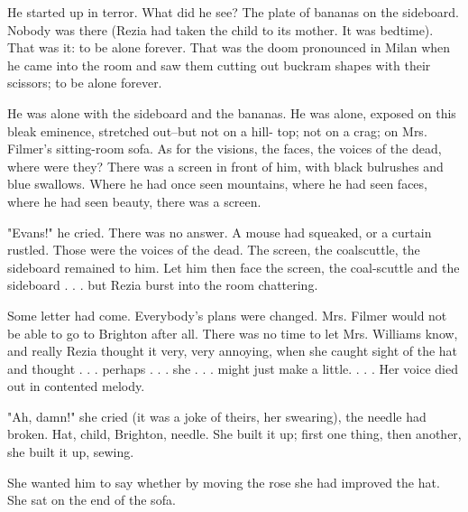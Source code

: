 \documentclass[lang=cn,10pt]{elegantbook}
\begin{document}
He started up in terror.  What did he see?  The plate of bananas on
the sideboard.  Nobody was there (Rezia had taken the child to its
mother.  It was bedtime).  That was it: to be alone forever.  That
was the doom pronounced in Milan when he came into the room and saw
them cutting out buckram shapes with their scissors; to be alone
forever.

He was alone with the sideboard and the bananas.  He was alone,
exposed on this bleak eminence, stretched out--but not on a hill-
top; not on a crag; on Mrs. Filmer's sitting-room sofa.  As for the
visions, the faces, the voices of the dead, where were they?  There
was a screen in front of him, with black bulrushes and blue
swallows.  Where he had once seen mountains, where he had seen
faces, where he had seen beauty, there was a screen.

"Evans!" he cried.  There was no answer.  A mouse had squeaked, or
a curtain rustled.  Those were the voices of the dead.  The screen,
the coalscuttle, the sideboard remained to him.  Let him then face
the screen, the coal-scuttle and the sideboard . . . but Rezia
burst into the room chattering.

Some letter had come.  Everybody's plans were changed.  Mrs. Filmer
would not be able to go to Brighton after all.  There was no time
to let Mrs. Williams know, and really Rezia thought it very, very
annoying, when she caught sight of the hat and thought . . .
perhaps . . . she . . . might just make a little. . . .  Her voice
died out in contented melody.

"Ah, damn!" she cried (it was a joke of theirs, her swearing), the
needle had broken.  Hat, child, Brighton, needle.  She built it up;
first one thing, then another, she built it up, sewing.

She wanted him to say whether by moving the rose she had improved
the hat.  She sat on the end of the sofa.
\end{document}

